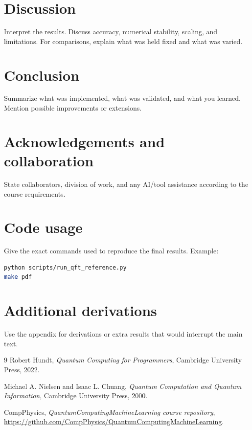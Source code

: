 \documentclass[11pt,a4paper]{article}
\begin{document}
\section{Discussion}
Interpret the results. Discuss accuracy, numerical stability, scaling, and limitations. For comparisons, explain what was held fixed and what was varied.

\section{Conclusion}
Summarize what was implemented, what was validated, and what you learned. Mention possible improvements or extensions.

\section*{Acknowledgements and collaboration}
State collaborators, division of work, and any AI/tool assistance according to the course requirements.

\appendix
\section{Code usage}
Give the exact commands used to reproduce the final results. Example:

\begin{lstlisting}[language=bash]
python scripts/run_qft_reference.py
make pdf
\end{lstlisting}

\section{Additional derivations}
Use the appendix for derivations or extra results that would interrupt the main text.

\begin{thebibliography}{9}
Robert Hundt, \emph{Quantum Computing for Programmers}, Cambridge University Press, 2022.

Michael A. Nielsen and Isaac L. Chuang, \emph{Quantum Computation and Quantum Information}, Cambridge University Press, 2000.

CompPhysics, \emph{QuantumComputingMachineLearning course repository}, \url{https://github.com/CompPhysics/QuantumComputingMachineLearning}.
\end{thebibliography}
\end{document}
